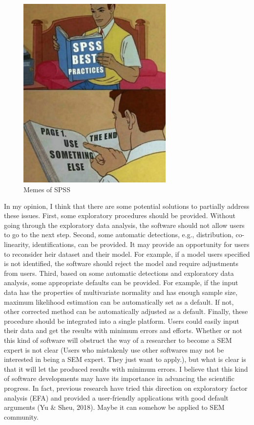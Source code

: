\documentclass[jou]{apa6}
\theoremstyle{definition}
\theoremstyle{definition}
\theoremstyle{definition}
\theoremstyle{remark}
\begin{document}
\begin{figure}

{\centering \includegraphics[width=3.03in]{SPSS} 

}

\caption{Memes of SPSS}\label{fig:SPSS}
\end{figure}

In my opinion, I think that there are some potential solutions to
partially address these issues. First, some exploratory procedures
should be provided. Without going through the exploratory data analysis,
the software should not allow users to go to the next step. Second, some
automatic detections, e.g., distribution, co-linearity, identifications,
can be provided. It may provide an opportunity for users to reconsider
heir dataset and their model. For example, if a model users specified is
not identified, the software should reject the model and require
adjustments from users. Third, based on some automatic detections and
exploratory data analysis, some appropriate defaults can be provided.
For example, if the input data has the properties of multivariate
normality and has enough sample size, maximum likelihood estimation can
be automatically set as a default. If not, other corrected method can be
automatically adjusted as a default. Finally, these procedure should be
integrated into a single platform. Users could easily input their data
and get the results with minimum errors and efforts. Whether or not this
kind of software will obstruct the way of a researcher to become a SEM
expert is not clear (Users who mistakenly use other softwares may not be
interested in being a SEM expert. They just want to apply.), but what is
clear is that it will let the produced results with minimum errors. I
believe that this kind of software developments may have its importance
in advancing the scientific progress. In fact, previous research have
tried this direction on exploratory factor analysis (EFA) and provided a
user-friendly applications with good default arguments (Yu \& Sheu,
2018). Maybe it can somehow be applied to SEM community.
\end{document}

